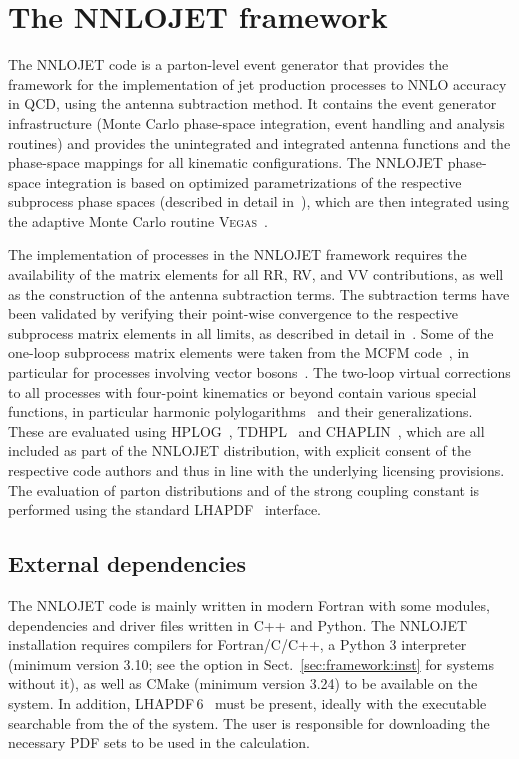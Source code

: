 \documentclass{SciPost}
\DeclareRobustCommand{\command}[1]{\makebox{\lstinline[language=commands]^#1^}}
\begin{document}
\section{The NNLOJET framework}
\label{sec:framework}
The NNLOJET code is a parton-level event generator that provides the framework for the implementation
of jet production processes to NNLO accuracy in QCD, using the antenna subtraction method. It contains
the event generator infrastructure (Monte Carlo phase-space integration, event handling and analysis routines) and
provides the unintegrated and integrated antenna functions and the phase-space mappings for all kinematic
configurations.
The NNLOJET phase-space integration is based on optimized parametrizations of the respective subprocess
phase spaces (described in detail in~\cite{Gehrmann:2018szu}), which are then integrated using the adaptive Monte Carlo routine \textsc{Vegas}~\cite{Lepage:1977sw}.


The implementation of processes in the NNLOJET framework requires the availability of the matrix
elements for all RR, RV, and VV contributions, as well as
the construction of the antenna subtraction terms. The subtraction terms have been validated by verifying their
point-wise convergence to the respective subprocess matrix elements in all limits, as described in detail
in~\cite{NigelGlover:2010kwr,Chen:2022ktf}.
Some of the one-loop subprocess matrix elements were taken from the \textsc{MCFM} code~\cite{Campbell:2019dru},
in particular for processes involving vector bosons~\cite{Campbell:2002tg}. The two-loop virtual corrections to
all processes with four-point kinematics or beyond contain various special functions, in particular harmonic
polylogarithms~\cite{Remiddi:1999ew} and their generalizations. These are evaluated using
\textsc{HPLOG}~\cite{Gehrmann:2001pz}, \textsc{TDHPL}~\cite{Gehrmann:2001jv} and \textsc{CHAPLIN}~\cite{Buehler:2011ev}, which
are all included as part of the NNLOJET distribution, with explicit consent of the respective code authors and thus
in line with the underlying licensing provisions.
The evaluation of parton distributions and of the strong coupling constant is performed using the
standard \textsc{LHAPDF}~\cite{Buckley:2014ana} interface.

\subsection{External dependencies}
\label{sec:framework:deps}
The NNLOJET code is mainly written in modern Fortran with some modules, dependencies and driver files written in C++ and Python.
The NNLOJET installation requires compilers for Fortran/C/C++, a Python 3 interpreter (minimum version 3.10; see the \command{DOKAN_FETCH_PYTHON} option in Sect.~\ref{sec:framework:inst} for systems without it),
as well as CMake (minimum version 3.24) to be available on the system.
In addition, \textsc{LHAPDF\,6}~\cite{Buckley:2014ana} must be present, ideally with the \command{lhapdf-config} executable searchable from the \command{\$PATH} of the system. The user is responsible for downloading the necessary PDF sets to be used in the calculation.
\end{document}
